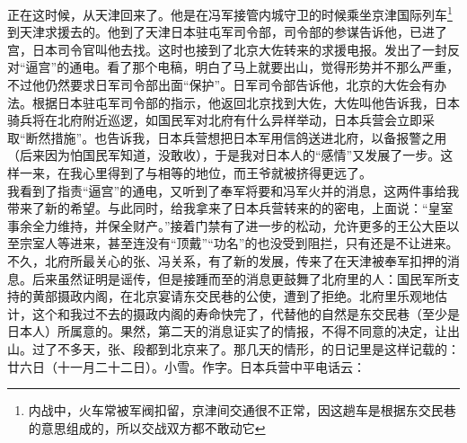 正在这时候，从天津回来了。他是在冯军接管内城守卫的时候乘坐京津国际列车\footnote{内战中，火车常被军阀扣留，京津间交通很不正常，因这趟车是根据东交民巷的意思组成的，所以交战双方都不敢动它}到天津求援去的。他到了天津日本驻屯军司令部，司令部的参谋告诉他，已进了宫，日本司令官叫他去找。这时也接到了北京大佐转来的求援电报。发出了一封反对“逼宫”的通电。看了那个电稿，明白了马上就要出山，觉得形势并不那么严重，不过他仍然要求日军司令部出面“保护”。日军司令部告诉他，北京的大佐会有办法。根据日本驻屯军司令部的指示，他返回北京找到大佐，大佐叫他告诉我，日本骑兵将在北府附近巡逻，如国民军对北府有什么异样举动，日本兵营会立即采取“断然措施”。也告诉我，日本兵营想把日本军用信鸽送进北府，以备报警之用（后来因为怕国民军知道，没敢收），于是我对日本人的“感情”又发展了一步。这样一来，在我心里得到了与相等的地位，而王爷就被挤得更远了。\\

我看到了指责“逼宫”的通电，又听到了奉军将要和冯军火并的消息，这两件事给我带来了新的希望。与此同时，给我拿来了日本兵营转来的的密电，上面说：“皇室事余全力维持，并保全财产。”接着门禁有了进一步的松动，允许更多的王公大臣以至宗室人等进来，甚至连没有“顶戴”“功名”的也没受到阻拦，只有还是不让进来。\\

不久，北府所最关心的张、冯关系，有了新的发展，传来了在天津被奉军扣押的消息。后来虽然证明是谣传，但是接踵而至的消息更鼓舞了北府里的人：国民军所支持的黄部摄政内阁，在北京宴请东交民巷的公使，遭到了拒绝。北府里乐观地估计，这个和我过不去的摄政内阁的寿命快完了，代替他的自然是东交民巷（至少是日本人）所属意的。果然，第二天的消息证实了的情报，不得不同意的决定，让出山。过了不多天，张、段都到北京来了。那几天的情形，的日记里是这样记载的：\\

廿六日（十一月二十二日）。小雪。作字。日本兵营中平电话云：\\

